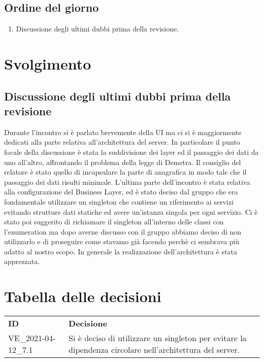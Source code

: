 \documentclass[]{article}
\begin{document}
	\subsection{Ordine del giorno}
	\begin{enumerate}
		\item Discussione degli ultimi dubbi prima della revisione.
	\end{enumerate}
	\newpage
	\section{Svolgimento}


	\subsection{Discussione degli ultimi dubbi prima della revisione}
	Durante l'incontro si è parlato brevemente della UI ma ci si è maggiormente dedicati alla parte relativa all'architettura del server.
	In particolare il punto focale della discussione è stata la suddivisione dei layer ed il passaggio dei dati da uno all'altro, affrontando il problema della legge di Demetra.
	Il consiglio del relatore è stato quello di incapsulare la parte di anagrafica in modo tale che il passaggio dei dati risulti minimale.
	L'ultima parte dell'incontro è stata relativa alla configurazione del Business Layer, ed è stato deciso dal gruppo che era fondamentale utilizzare un singleton che contiene un riferimento ai servizi evitando strutture dati statiche ed avere un'istanza singola per ogni servizio.
	Ci è stato poi suggerito di richiamare il singleton all'interno delle classi con l'enumeration ma dopo averne discusso con il gruppo abbiamo deciso di non utilizzarlo e di proseguire come stavamo già facendo perchè ci sembrava più adatto al nostro scopo.
	In generale la realizzazione dell'architettura è stata apprezzata.

	\newpage

	\section{Tabella delle decisioni}

	\begin{table} [h!]
		\begin{center}
			\begin{tabular} { m{2cm} m{14cm} }
				\rowcolor{lightgray}
				\textbf{ID} & \textbf{Decisione}\\
				VE\_2021-04-12\_7.1 & Si è deciso di utilizzare un singleton per evitare la dipendenza circolare nell'architettura del server.
			\end{tabular}
		\end{center}
	\end{table}
\end{document}
